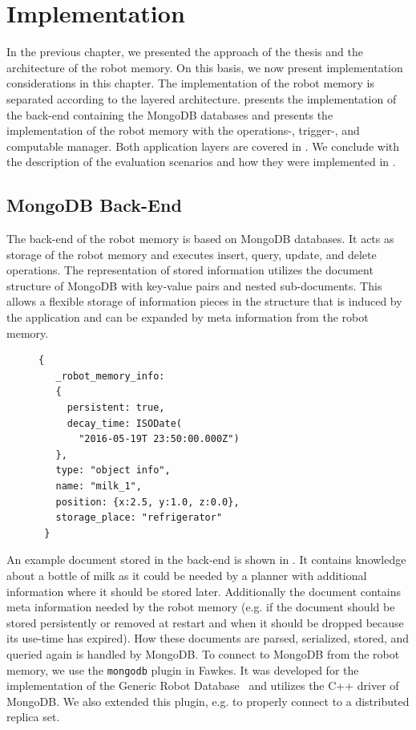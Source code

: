 \chapter{Implementation}
\label{chap:impl}
In the previous chapter, we presented the approach of the thesis and
the architecture of the robot memory. On this basis, we now present
implementation considerations in this chapter. The implementation of
the robot memory is separated according to the layered
architecture.  presents the implementation of the
back-end containing the MongoDB databases and 
presents the implementation of the robot memory with the operations-,
trigger-, and computable manager. Both application layers are covered
in . We conclude with the description of the
evaluation scenarios and how they were implemented in
.

\section{MongoDB Back-End}
\label{sec:back-end}
The back-end of the robot memory is based on MongoDB databases. It
acts as storage of the robot memory and executes insert, query,
update, and delete operations. The representation of stored information
utilizes the document structure of MongoDB with key-value pairs and
nested sub-documents. This allows a flexible storage of
information pieces in the structure that is induced by the application
and can be expanded by meta information from the robot memory.

\begin{figure}
  \vspace{-0.8cm}
\begin{lstlisting}[style=SmallJSON,
  caption={Representation of a knowledge piece in the back-end},
  label=lst:backend,
  framexleftmargin=1pt, xleftmargin=0pt,
 morekeywords={}, numbers=none]
 {
   _robot_memory_info:
   {
     persistent: true,
     decay_time: ISODate(
       "2016-05-19T 23:50:00.000Z")
   },
   type: "object info",
   name: "milk_1",
   position: {x:2.5, y:1.0, z:0.0},
   storage_place: "refrigerator"
 }
\end{lstlisting}
\vspace{-8mm}
\end{figure}
An example document stored in the back-end is shown in
. It contains knowledge about a bottle of milk as
it could be needed by a planner with additional information where it
should be stored later. Additionally the document contains meta
information needed by the robot memory (e.g. if the document should be
stored persistently or removed at restart and when it should be
dropped because its use-time has expired). How these documents are
parsed, serialized, stored, and queried again is handled by
MongoDB. To connect to MongoDB from the robot memory, we use the
\texttt{mongodb} plugin in Fawkes. It was developed for the
implementation of the Generic Robot Database~\cite{RoboDB} and
utilizes the C++ driver of MongoDB. We also extended this plugin,
e.g. to properly connect to a distributed replica set.

